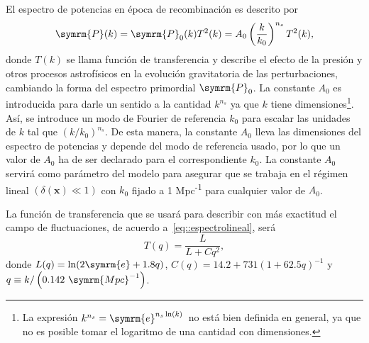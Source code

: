 El espectro de potencias en época de recombinación es descrito por
\begin{equation}
    \symrm{P}(k)=\symrm{P}_0(k)T^2(k)=A_0\left(\frac{k}{k_0}\right)^{n_s}T^2(k),\label{eq::espectrolineal}
\end{equation}
donde \(T(k)\) se llama función de transferencia y describe el efecto de la presión y otros procesos astrofísicos en la evolución gravitatoria de las perturbaciones, cambiando la forma del espectro primordial \(\symrm{P}_0\). La constante \(A_0\) es introducida para darle un sentido a la cantidad \(k^{n_s}\) ya que \(k\) tiene dimensiones\footnote{ La expresión \(k^{n_s}=\symrm{e}^{n_s\ln(k)}\,\) no está bien definida en general, ya que no es posible tomar el logaritmo de una cantidad con dimensiones.}. Así, se introduce un modo de Fourier de referencia \(k_0\) para escalar las unidades de \(k\) tal que \(\left(k/k_0\right)^{n_s}\). De esta manera, la constante \(A_0\) lleva las dimensiones del espectro de potencias y depende del modo de referencia usado, por lo que un valor de \(A_0\) ha de ser declarado para el correspondiente \(k_0\). La constante \(A_0\) servirá como parámetro del modelo para asegurar que se trabaja en el régimen lineal \((\delta(\symbf{x})\ll 1)\) con \(k_0\) fijado a 1 Mpc\textsuperscript{-1} para cualquier valor de \(A_0\).

La función de transferencia que se usará para describir con más     exactitud el campo de fluctuaciones, de acuerdo a~\eqref{eq::espectrolineal}, será~\cite{eisenstein1998baryonic}
\begin{equation}
    T(q)=\frac{L}{L+Cq^2},\label{eq::transff}
\end{equation}
donde \(L(q)=\ln(2\symrm{e}+1.8q)\), \(C(q)=14.2+{731}\left(1+62.5q\right)^{-1}\) y \(q\equiv k/\left(0.142\ \symrm{Mpc}^{-1}\right)\).

